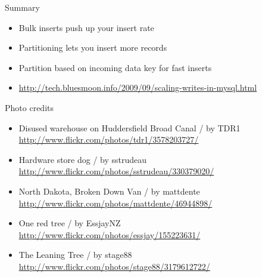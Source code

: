 \documentclass{beamer}
\begin{document}
\begin{frame}{Summary}
  \begin{block}{}
  \begin{itemize}
  \item Bulk inserts push up your insert rate
  \item Partitioning lets you insert more records
  \item Partition based on incoming data key for fast inserts
  \item \href{http://tech.bluesmoon.info/2009/09/scaling-writes-in-mysql.html}{\small{http://tech.bluesmoon.info/2009/09/scaling-writes-in-mysql.html}}
  \end{itemize}
  \end{block}
\end{frame}

\begin{frame}{Photo credits}
  \small{
  \begin{itemize}
  \item Disused warehouse on Huddersfield Broad Canal / by TDR1 \\ \href{http://www.flickr.com/photos/tdr1/3578203727/}{http://www.flickr.com/photos/tdr1/3578203727/}
  \item Hardware store dog / by sstrudeau \\ \href{http://www.flickr.com/photos/sstrudeau/330379020/}{http://www.flickr.com/photos/sstrudeau/330379020/}
  \item North Dakota, Broken Down Van / by mattdente \\ \href{http://www.flickr.com/photos/mattdente/46944898/}{http://www.flickr.com/photos/mattdente/46944898/}
  \item One red tree / by EssjayNZ \\ \href{http://www.flickr.com/photos/essjay/155223631/}{http://www.flickr.com/photos/essjay/155223631/}
  \item The Leaning Tree / by stage88 \\ \href{http://www.flickr.com/photos/stage88/3179612722/}{http://www.flickr.com/photos/stage88/3179612722/}
  \end{itemize}
  }
\end{frame}
\end{document}
